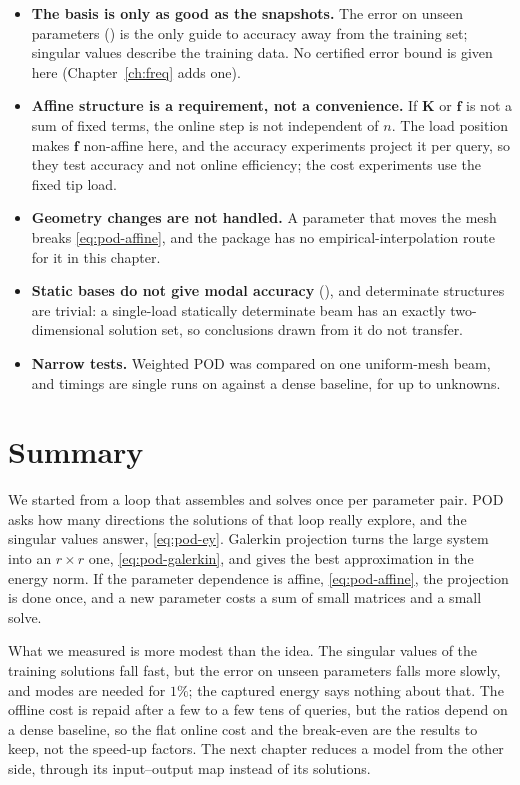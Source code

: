 \begin{limitsbox}
\begin{itemize}
\item \textbf{The basis is only as good as the snapshots.} The error on unseen parameters () is the only guide to accuracy away from the training set; singular values describe the training data. No certified error bound is given here (Chapter~\ref{ch:freq} adds one).
\item \textbf{Affine structure is a requirement, not a convenience.} If $\bm K$ or $\bm f$ is not a sum of fixed terms, the online step is not independent of $n$. The load position makes $\bm f$ non-affine here, and the accuracy experiments project it per query, so they test accuracy and not online efficiency; the cost experiments use the fixed tip load.
\item \textbf{Geometry changes are not handled.} A parameter that moves the mesh breaks \cref{eq:pod-affine}, and the package has no empirical-interpolation route for it in this chapter.
\item \textbf{Static bases do not give modal accuracy} (), and determinate structures are trivial: a single-load statically determinate beam has an exactly two-dimensional solution set, so conclusions drawn from it do not transfer.
\item \textbf{Narrow tests.} Weighted POD was compared on one uniform-mesh beam, and timings are single runs on \machine{} against a dense baseline, for up to \cpdBigNf unknowns.
\end{itemize}
\end{limitsbox}

\section{Summary}\label{sec:pod-summary}

We started from a loop that assembles and solves once per parameter pair. POD asks how many directions the solutions of that loop really explore, and the singular values answer, \cref{eq:pod-ey}. Galerkin projection turns the large system into an $r\times r$ one, \cref{eq:pod-galerkin}, and gives the best approximation in the energy norm. If the parameter dependence is affine, \cref{eq:pod-affine}, the projection is done once, and a new parameter costs a sum of small matrices and a small solve.

What we measured is more modest than the idea. The singular values of the training solutions fall fast, but the error on unseen parameters falls more slowly, and \cpdModesForOnePct modes are needed for $1\%$; the captured energy says nothing about that. The offline cost is repaid after a few to a few tens of queries, but the ratios depend on a dense baseline, so the flat online cost and the break-even are the results to keep, not the speed-up factors. The next chapter reduces a model from the other side, through its input--output map instead of its solutions.

